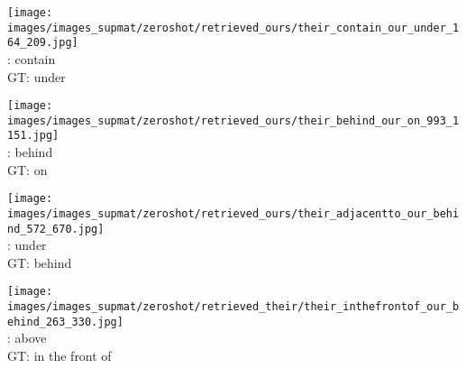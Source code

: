 \documentclass[10pt,twocolumn,letterpaper]{article}
\begin{document}
\begin{figure*}[t]
    \begin{minipage}[t]{0.185\textwidth}
    	\centering
       	\texttt{[image: images/images\_supmat/zeroshot/retrieved\_ours/their\_contain\_our\_under\_164\_209.jpg]}\\
       	\vspace{0.3ex}
       	\cite{Lu16}: contain \\
       	GT: under
       	\vspace{2ex}
    \end{minipage}
    \hspace{0.005\textwidth}
    \begin{minipage}[t]{0.185\textwidth}
    	\centering
       	\texttt{[image: images/images\_supmat/zeroshot/retrieved\_ours/their\_behind\_our\_on\_993\_1151.jpg]}\\
       	\vspace{0.3ex}
       	\cite{Lu16}: behind \\
       	GT: on
       	\vspace{0.2ex}
    \end{minipage}
    \hspace{0.005\textwidth}
    \begin{minipage}[t]{0.185\textwidth}
    	\centering
       	\texttt{[image: images/images\_supmat/zeroshot/retrieved\_ours/their\_adjacentto\_our\_behind\_572\_670.jpg]}\\
		\vspace{0.3ex}       	
       	\cite{Lu16}: under \\
       	GT: behind
       	\vspace{0.2ex}
    \end{minipage}
    \hspace{0.005\textwidth}
    \begin{minipage}[t]{0.185\textwidth}
    	\centering
       	\texttt{[image: images/images\_supmat/zeroshot/retrieved\_their/their\_inthefrontof\_our\_behind\_263\_330.jpg]}\\
		\vspace{0.3ex}       	
       	\cite{Lu16}: above \\
       	GT: in the front of

\end{minipage}
\end{figure*}
\end{document}
